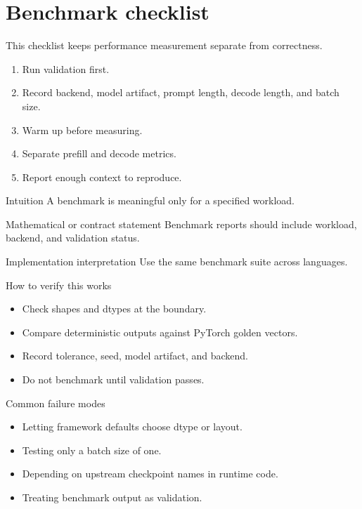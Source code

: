 \chapter{Benchmark checklist}
\label{app:benchmark-check}
This checklist keeps performance measurement separate from correctness.


\begin{enumerate}[label=\textbf{I.\arabic*.}]
\item Run validation first.
\item Record backend, model artifact, prompt length, decode length, and batch size.
\item Warm up before measuring.
\item Separate prefill and decode metrics.
\item Report enough context to reproduce.
\end{enumerate}


\begin{intuitionbox}{Intuition}
A benchmark is meaningful only for a specified workload.
\end{intuitionbox}

\begin{definitionbox}{Mathematical or contract statement}
Benchmark reports should include workload, backend, and validation status.
\end{definitionbox}

\begin{implementationbox}{Implementation interpretation}
Use the same benchmark suite across languages.
\end{implementationbox}

\begin{verificationbox}{How to verify this works}
\begin{itemize}
\item Check shapes and dtypes at the boundary.
\item Compare deterministic outputs against PyTorch golden vectors.
\item Record tolerance, seed, model artifact, and backend.
\item Do not benchmark until validation passes.
\end{itemize}
\end{verificationbox}

\begin{warningbox}{Common failure modes}
\begin{itemize}
\item Letting framework defaults choose dtype or layout.
\item Testing only a batch size of one.
\item Depending on upstream checkpoint names in runtime code.
\item Treating benchmark output as validation.
\end{itemize}
\end{warningbox}

